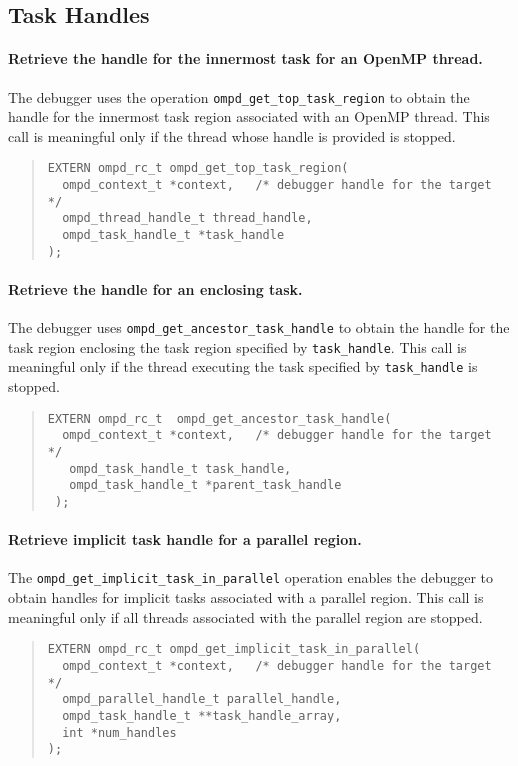 \documentclass{article}
\begin{document}
\subsection{Task Handles}
\paragraph{Retrieve the handle for the innermost task for an OpenMP thread.}
The  debugger uses the operation  \verb|ompd_get_top_task_region|  to obtain the handle for the innermost task region associated with an OpenMP thread. This call is meaningful only if the thread whose handle is provided is stopped.
\begin{quote}
 \begin{verbatim}
EXTERN ompd_rc_t ompd_get_top_task_region(
  ompd_context_t *context,   /* debugger handle for the target */
  ompd_thread_handle_t thread_handle, 
  ompd_task_handle_t *task_handle
);
\end{verbatim}
 \end{quote}

 \paragraph{Retrieve the handle for an enclosing task.}
The  debugger uses   \verb|ompd_get_ancestor_task_handle|  to obtain the handle for the task region enclosing the task region specified by \verb|task_handle|. This call is meaningful only if the thread executing the task specified by   \verb|task_handle|  is stopped.
\begin{quote}
 \begin{verbatim}
EXTERN ompd_rc_t  ompd_get_ancestor_task_handle(
  ompd_context_t *context,   /* debugger handle for the target */
   ompd_task_handle_t task_handle,
   ompd_task_handle_t *parent_task_handle
 );
 \end{verbatim}
  \end{quote}
 
  \paragraph{Retrieve implicit task handle for a parallel region.}
The   \verb|ompd_get_implicit_task_in_parallel|  operation enables the debugger to obtain handles for implicit tasks associated with a parallel region.
This call is meaningful only if all threads associated with the parallel region are stopped.


\begin{quote}
\begin{verbatim}
EXTERN ompd_rc_t ompd_get_implicit_task_in_parallel(
  ompd_context_t *context,   /* debugger handle for the target */
  ompd_parallel_handle_t parallel_handle, 
  ompd_task_handle_t **task_handle_array, 
  int *num_handles
);
\end{verbatim}
\end{quote}
\end{document}
